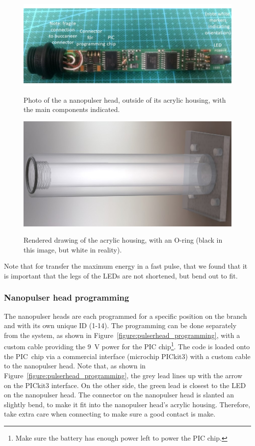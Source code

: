 \begin{figure}
\begin{center}	
  \includegraphics[width=1.0\linewidth]{figures/pulserhead.jpg}
  \caption{Photo of the a nanopulser head, outside of its acrylic housing, with the main components indicated.}
  \label{figure:pulserhead}
  \includegraphics[width=0.75\linewidth]{figures/PulserTube2.jpg}
  \caption{Rendered drawing of the acrylic housing, with an O-ring (black in this image, but white in reality).}
  \label{figure:pulserhead_housing}
\end{center}
\end{figure}

Note that for transfer the maximum energy in a fast pulse, that we found that it is important that the legs of the LEDs are not shortened, but bend out to fit.

%
%

\subsubsection*{Nanopulser head programming}

The nanopulser heads are each programmed for a specific position on the branch and with its own unique ID (1-14). 
The programming can be done separately from the system, as shown in Figure~\ref{figure:pulserhead_programming}, with a custom cable providing the 9~V power for the PIC chip\footnote{Make sure the battery has enough power left to power the PIC chip.}. The code is loaded onto the PIC~chip via a commercial interface (microchip PICkit3) with a custom cable to the nanopulser head. Note that, as shown in Figure~\ref{figure:pulserhead_programming}, the grey lead lines up with the arrow on the PICkit3 interface. On the other side, the green lead is closest to the LED on the nanopulser head. The connector on the nanopulser head is slanted an slightly bend, to make it fit into the nanopulser head's acrylic housing. Therefore, take extra care when connecting to make sure a good contact is make.

